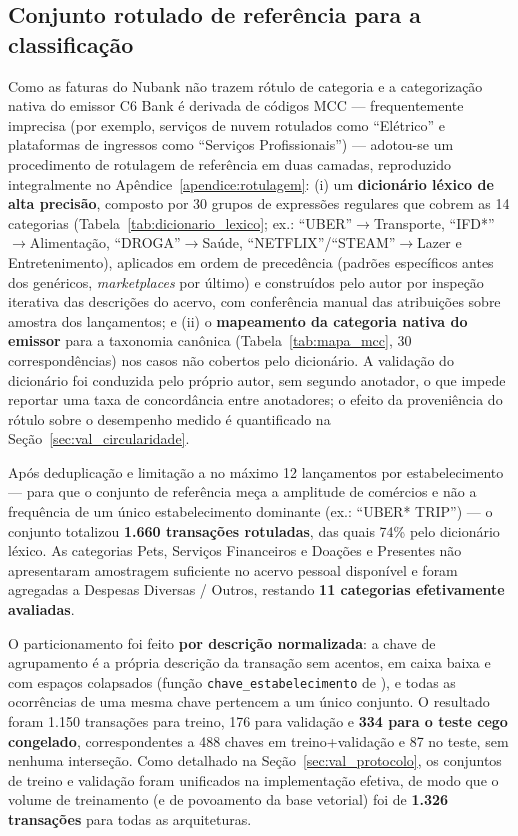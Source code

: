 \subsection{Conjunto rotulado de referência para a classificação}
\label{sec:val_dataset_classificacao}

Como as faturas do Nubank não trazem rótulo de categoria e a categorização nativa do emissor C6 Bank é derivada de códigos MCC --- frequentemente imprecisa (por exemplo, serviços de nuvem rotulados como ``Elétrico'' e plataformas de ingressos como ``Serviços Profissionais'') --- adotou-se um procedimento de rotulagem de referência em duas camadas, reproduzido integralmente no Apêndice~\ref{apendice:rotulagem}: (i) um \textbf{dicionário léxico de alta precisão}, composto por 30 grupos de expressões regulares que cobrem as 14 categorias (Tabela~\ref{tab:dicionario_lexico}; ex.: ``UBER''$\rightarrow$Transporte, ``IFD*''$\rightarrow$Alimentação, ``DROGA''$\rightarrow$Saúde, ``NETFLIX''/``STEAM''$\rightarrow$Lazer e Entretenimento), aplicados em ordem de precedência (padrões específicos antes dos genéricos, \textit{marketplaces} por último) e construídos pelo autor por inspeção iterativa das descrições do acervo, com conferência manual das atribuições sobre amostra dos lançamentos; e (ii) o \textbf{mapeamento da categoria nativa do emissor} para a taxonomia canônica (Tabela~\ref{tab:mapa_mcc}, 30 correspondências) nos casos não cobertos pelo dicionário. A validação do dicionário foi conduzida pelo próprio autor, sem segundo anotador, o que impede reportar uma taxa de concordância entre anotadores; o efeito da proveniência do rótulo sobre o desempenho medido é quantificado na Seção~\ref{sec:val_circularidade}.

Após deduplicação e limitação a no máximo 12 lançamentos por estabelecimento --- para que o conjunto de referência meça a amplitude de comércios e não a frequência de um único estabelecimento dominante (ex.: ``UBER* TRIP'') --- o conjunto totalizou \textbf{1.660 transações rotuladas}, das quais 74\% pelo dicionário léxico. As categorias Pets, Serviços Financeiros e Doações e Presentes não apresentaram amostragem suficiente no acervo pessoal disponível e foram agregadas a Despesas Diversas / Outros, restando \textbf{11 categorias efetivamente avaliadas}.

O particionamento foi feito \textbf{por descrição normalizada}: a chave de agrupamento é a própria descrição da transação sem acentos, em caixa baixa e com espaços colapsados (função \texttt{chave\_estabelecimento} de ), e todas as ocorrências de uma mesma chave pertencem a um único conjunto. O resultado foram 1.150 transações para treino, 176 para validação e \textbf{334 para o teste cego congelado}, correspondentes a 488 chaves em treino+validação e 87 no teste, sem nenhuma interseção. Como detalhado na Seção~\ref{sec:val_protocolo}, os conjuntos de treino e validação foram unificados na implementação efetiva, de modo que o volume de treinamento (e de povoamento da base vetorial) foi de \textbf{1.326 transações} para todas as arquiteturas.


